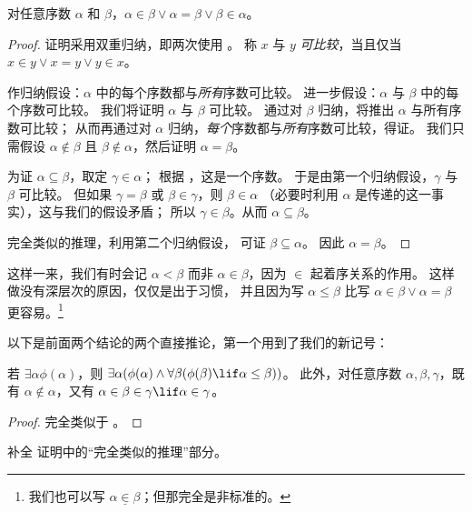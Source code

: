 \documentclass[../../../include/open-logic-section]{subfiles}
\begin{document}
\begin{thm}[三分法]
对任意序数 $\alpha$ 和 $\beta$，$\alpha \in \beta \lor \alpha = \beta \lor \beta \in \alpha$。
\end{thm}

\begin{proof}
证明采用双重归纳，即两次使用
。
称 $x$ 与 $y$ \emph{可比较}，当且仅当 $x \in y \lor x = y \lor y \in x$。

作归纳假设：$\alpha$ 中的每个序数都与\emph{所有}序数可比较。
进一步假设：$\alpha$ 与 $\beta$ 中的每个序数可比较。
我们将证明 $\alpha$ 与 $\beta$ 可比较。
通过对 $\beta$ 归纳，将推出 $\alpha$ 与所有序数可比较；
从而再通过对 $\alpha$ 归纳，\emph{每个}序数都与\emph{所有}序数可比较，得证。
我们只需假设 $\alpha \notin \beta$ 且 $\beta \notin \alpha$，然后证明 $\alpha = \beta$。

为证 $\alpha \subseteq \beta$，取定 $\gamma \in \alpha$；
根据 ，这是一个序数。
于是由第一个归纳假设，$\gamma$ 与 $\beta$ 可比较。
但如果 $\gamma = \beta$ 或 $\beta \in \gamma$，则 $\beta \in \alpha$
（必要时利用 $\alpha$ 是传递的这一事实），这与我们的假设矛盾；
所以 $\gamma \in \beta$。从而 $\alpha \subseteq \beta$。

完全类似的推理，利用第二个归纳假设，
可证 $\beta \subseteq \alpha$。
因此 $\alpha = \beta$。
\end{proof}\noindent 这样一来，我们有时会记 $\alpha <\beta$
而非 $\alpha \in \beta$，因为 $\in$ 起着序关系的作用。
这样做没有深层次的原因，仅仅是出于习惯，
并且因为写 $\alpha \leq \beta$ 比写 $\alpha \in
\beta \lor \alpha = \beta$ 更容易。\footnote{我们也可以写 $\alpha
\mathrel{\underline{\in}} \beta$；但那完全是非标准的。}

以下是前面两个结论的两个直接推论，第一个用到了我们的新记号：


\begin{cor}
若 $\exists \alpha\phi(\alpha)$，则 $\exists \alpha(\phi(\alpha)
\land \forall \beta(\phi(\beta) \lif \alpha \leq \beta))$。
此外，对任意序数 $\alpha, \beta, \gamma$，既有 $\alpha
\notin \alpha$，又有 $\alpha \in \beta \in \gamma \lif \alpha \in
\gamma$。
\end{cor}

\begin{proof}
完全类似于 。
\end{proof}

\begin{prob}
补全  证明中的“完全类似的推理”部分。
\end{prob}
\end{document}
